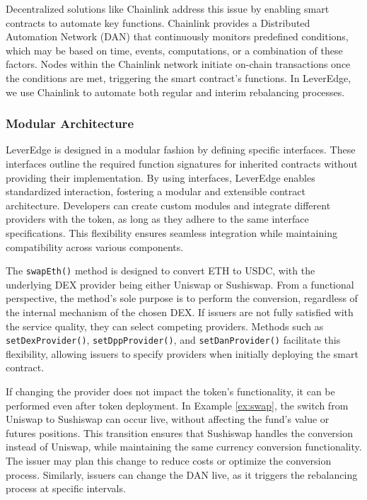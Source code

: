 Decentralized solutions like Chainlink address this issue by enabling smart contracts to automate key functions. Chainlink provides a Distributed Automation Network (DAN) that continuously monitors predefined conditions, which may be based on time, events, computations, or a combination of these factors. Nodes within the Chainlink network initiate on-chain transactions once the conditions are met, triggering the smart contract’s functions. In LeverEdge, we use Chainlink to automate both regular and interim rebalancing processes.

\subsubsection{Modular Architecture}
LeverEdge is designed in a modular fashion by defining specific interfaces. These interfaces outline the required function signatures for inherited contracts without providing their implementation. By using interfaces, LeverEdge enables standardized interaction, fostering a modular and extensible contract architecture. Developers can create custom modules and integrate different providers with the token, as long as they adhere to the same interface specifications. This flexibility ensures seamless integration while maintaining compatibility across various components.

\begin{example}\label{ex:swap}
	The \texttt{swapEth()} method is designed to convert ETH to USDC, with the underlying DEX provider being either Uniswap or Sushiswap. From a functional perspective, the method’s sole purpose is to perform the conversion, regardless of the internal mechanism of the chosen DEX. If issuers are not fully satisfied with the service quality, they can select competing providers. Methods such as \texttt{setDexProvider()}, \texttt{setDppProvider()}, and \texttt{setDanProvider()} facilitate this flexibility, allowing issuers to specify providers when initially deploying the smart contract. 
\end{example}

If changing the provider does not impact the token's functionality, it can be performed even after token deployment. In Example \ref{ex:swap}, the switch from Uniswap to Sushiswap can occur live, without affecting the fund's value or futures positions. This transition ensures that Sushiswap handles the conversion instead of Uniswap, while maintaining the same currency conversion functionality. The issuer may plan this change to reduce costs or optimize the conversion process. Similarly, issuers can change the DAN live, as it triggers the rebalancing process at specific intervals.

